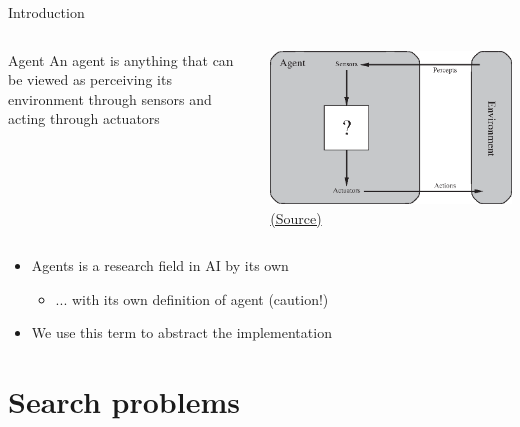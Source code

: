 \documentclass[10pt,compress]{beamer} %
\begin{document}
\begin{frame}{Introduction}
    \begin{columns}
        \begin{block}{Agent}
        An agent is anything that can be viewed as perceiving its environment through sensors and acting through actuators
        \end{block}

        \begin{center}
	        \includegraphics[width=0.9\linewidth]{figs/agent-environment.eps}\\
	        \tiny{\href{http://aima.cs.berkeley.edu/index.html}{(Source)}}
	    \end{center}

	\end{columns}

    \begin{itemize}
        \item Agents is a research field in AI by its own 
            \begin{itemize}
                \item ... with its own definition of agent (caution!)
            \end{itemize}
        \item We use this term to abstract the implementation
    \end{itemize}
\end{frame}

\section{Search problems}
\end{document}
